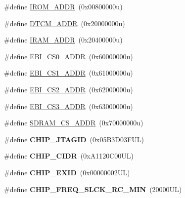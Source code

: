 \begin{DoxyCompactItemize}
\item 
\#define \mbox{\hyperlink{group__SAMS70Q20__definitions_ga694212ffb8c2786bacee3d0ad6020bda}{I\+R\+O\+M\+\_\+\+A\+D\+DR}}~(0x00800000u)
\item 
\#define \mbox{\hyperlink{group__SAMS70Q20__definitions_ga26626a425f7ebb3a0c2dbc276f0d9f78}{D\+T\+C\+M\+\_\+\+A\+D\+DR}}~(0x20000000u)
\item 
\#define \mbox{\hyperlink{group__SAMS70Q20__definitions_gaae45ac2ef16942159481c767ac4805cf}{I\+R\+A\+M\+\_\+\+A\+D\+DR}}~(0x20400000u)
\item 
\#define \mbox{\hyperlink{group__SAMS70Q20__definitions_ga9bcbb97ddae3b2cc5e2c9613d33f66b4}{E\+B\+I\+\_\+\+C\+S0\+\_\+\+A\+D\+DR}}~(0x60000000u)
\item 
\#define \mbox{\hyperlink{group__SAMS70Q20__definitions_gaaddd9fdbbc77c9aced5308819f502a26}{E\+B\+I\+\_\+\+C\+S1\+\_\+\+A\+D\+DR}}~(0x61000000u)
\item 
\#define \mbox{\hyperlink{group__SAMS70Q20__definitions_ga058a35f9991487dc2dd12ada792d0730}{E\+B\+I\+\_\+\+C\+S2\+\_\+\+A\+D\+DR}}~(0x62000000u)
\item 
\#define \mbox{\hyperlink{group__SAMS70Q20__definitions_gad66ebdd0fc33ec3cf85dbaa14bbf05d9}{E\+B\+I\+\_\+\+C\+S3\+\_\+\+A\+D\+DR}}~(0x63000000u)
\item 
\#define \mbox{\hyperlink{group__SAMS70Q20__definitions_ga61b7db25daf759c2a2beb6e5a0b57a84}{S\+D\+R\+A\+M\+\_\+\+C\+S\+\_\+\+A\+D\+DR}}~(0x70000000u)
\item 
\mbox{\label{group__SAMS70Q20__definitions_gaa614519778eec0df55d3eeab3223e3f6}} 
\#define {\bfseries C\+H\+I\+P\+\_\+\+J\+T\+A\+G\+ID}~(0x05\+B3\+D03\+F\+U\+L)
\item 
\mbox{\label{group__SAMS70Q20__definitions_ga1e1ae44dd9269a8a98c1d7e7a60e9fbd}} 
\#define {\bfseries C\+H\+I\+P\+\_\+\+C\+I\+DR}~(0x\+A1120\+C00\+U\+L)
\item 
\mbox{\label{group__SAMS70Q20__definitions_ga35123717aa86b76bb6b73cf3adc4c2e6}} 
\#define {\bfseries C\+H\+I\+P\+\_\+\+E\+X\+ID}~(0x00000002\+U\+L)
\item 
\mbox{\label{group__SAMS70Q20__definitions_ga0e868bf27426399dfdcb3a9dfc3733c4}} 
\#define {\bfseries C\+H\+I\+P\+\_\+\+F\+R\+E\+Q\+\_\+\+S\+L\+C\+K\+\_\+\+R\+C\+\_\+\+M\+IN}~(20000\+U\+L)

\end{DoxyCompactItemize}
